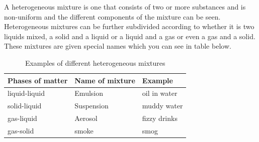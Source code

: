\label{m38708*fhsst!!!underscore!!!id89}\Definition{\label{id2405839} { Heterogeneous mixture }} 
{ \label{m38708*meaningfhsst!!!underscore!!!id89}
        A heterogeneous mixture is one that consists of two or more substances and is non-uniform and the different components of the mixture can be seen.
         } 
Heterogeneous mixtures can be further subdivided according to whether it is two liquids mixed, a solid and a liquid or a liquid and a gas or even a gas and a solid. These mixtures are given special names which you can see in table below. \par
\begin{table}[h!]
 \begin{center}
  \begin{tabular}{|l|l|l|}\hline
   \textbf{Phases of matter} & \textbf{Name of mixture} & \textbf{Example} \\ \hline
   liquid-liquid & Emulsion & oil in water \\ \hline
   solid-liquid & Suspension & muddy water \\ \hline
   gas-liquid & Aerosol & fizzy drinks \\ \hline
   gas-solid & smoke & smog \\ \hline
  \end{tabular}

 \end{center}
\caption{Examples of different heterogeneous mixtures}
\label{tab:mixtures}
\end{table}
\\
      \label{m38708*uid6}
